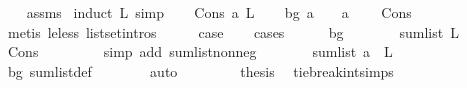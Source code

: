 \begin{isabellebody}
%
\isadelimproof
\ \ %
\endisadelimproof
%
\isatagproof
{}\isamarkupfalse%
\ assms\ \isanewline
{}\isamarkupfalse%
{\isacharparenleft}{\kern0pt}induct\ L{\isacharcomma}{\kern0pt}\ simp{\isacharparenright}{\kern0pt}\isanewline
\ \ \isamarkupfalse%
\ {\isacharparenleft}{\kern0pt}Cons\ a{}\ L{\isacharparenright}{\kern0pt}\isanewline
\ \ \isamarkupfalse%
\ {\isacharparenleft}{\kern0pt}bg{\isacharparenright}{\kern0pt}\ {\isachardoublequoteopen}a{}\ {\isachargreater}{\kern0pt}\ {}{\isachardoublequoteclose}\ {\isacharbar}{\kern0pt}\ {\isachardoublequoteopen}a{}\ {\isacharequal}{\kern0pt}\ {}{\isachardoublequoteclose}\ \isamarkupfalse%
\ Cons\isanewline
\ \ \ \ \isamarkupfalse%
\ {\isacharparenleft}{\kern0pt}metis\ le{\isacharunderscore}{\kern0pt}less\ list{\isachardot}{\kern0pt}set{\isacharunderscore}{\kern0pt}intros{\isacharparenleft}{\kern0pt}{}{\isacharparenright}{\kern0pt}{\isacharparenright}{\kern0pt}\isanewline
\ \ \isamarkupfalse%
\ \isamarkupfalse%
\ {\isacharquery}{\kern0pt}case\ \isanewline
\ \ \isamarkupfalse%
{\isacharparenleft}{\kern0pt}cases{\isacharparenright}{\kern0pt}\isanewline
\ \ \ \ \isamarkupfalse%
\ bg\isanewline
\ \ \ \ \isamarkupfalse%
\ \isamarkupfalse%
\ {\isachardoublequoteopen}sum{\isacharunderscore}{\kern0pt}list\ L\ {\isasymge}\ {}\ {\isachardoublequoteclose}\ \isamarkupfalse%
\ Cons\ \isanewline
\ \ \ \ \ \ \isamarkupfalse%
\ {\isacharparenleft}{\kern0pt}simp\ add{\isacharcolon}{\kern0pt}\ sum{\isacharunderscore}{\kern0pt}list{\isacharunderscore}{\kern0pt}nonneg{\isacharparenright}{\kern0pt}\isanewline
\ \ \ \ \isamarkupfalse%
\ \isamarkupfalse%
\ {\isachardoublequoteopen}sum{\isacharunderscore}{\kern0pt}list\ {\isacharparenleft}{\kern0pt}a{}\ {\isacharhash}{\kern0pt}\ L{\isacharparenright}{\kern0pt}\ {\isachargreater}{\kern0pt}\ {}{\isachardoublequoteclose}\ \isamarkupfalse%
\ bg\ sum{\isacharunderscore}{\kern0pt}list{\isacharunderscore}{\kern0pt}def\isanewline
\ \ \ \ \ \ \isamarkupfalse%
\ auto\ \isanewline
\ \ \ \ \isamarkupfalse%
\ \isamarkupfalse%
\ {\isacharquery}{\kern0pt}thesis\ \isamarkupfalse%
\ tie{\isacharunderscore}{\kern0pt}break{\isacharunderscore}{\kern0pt}int{\isachardot}{\kern0pt}simps\isanewline

\end{isabellebody}
